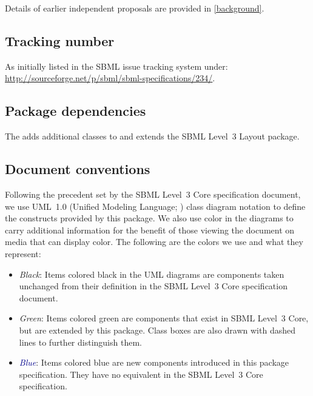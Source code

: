 Details of earlier independent proposals are provided 
in \ref{background}. 

\subsection{Tracking number} 
As initially listed in the SBML issue tracking system under:\\ 
\url{http://sourceforge.net/p/sbml/sbml-specifications/234/}. 

\subsection{Package dependencies} 

The \RenderPackage adds additional classes to \sbmlthreecore and extends the 
SBML Level~3 Layout package. 

\subsection{Document conventions} \label{conventions} 

Following the precedent set by the SBML Level~3 Core specification 
document, we use UML~1.0 (Unified Modeling Language; 
\citealt{eriksson:1998,oestereich:1999}) class diagram notation to 
define the constructs provided by this package. We also use color in the 
diagrams to carry additional information for the benefit of those 
viewing the document on media that can display color. The following are 
the colors we use and what they represent: 

\begin{itemize} 

\item[\raisebox{2.75pt}{\colorbox{black}{\rule{0.8pt}{0.8pt}}}] 
\emph{Black}: Items colored black in the UML diagrams are components 
taken unchanged from their definition in the SBML Level~3 Core 
specification document. 

\item[\raisebox{2.75pt}{\colorbox{mediumgreen}{\rule{0.8pt}{0.8pt}}}] 
\emph{\textcolor{mediumgreen}{Green}}: Items colored green are 
components that exist in SBML Level~3 Core, but are extended by this 
package. Class boxes are also drawn with dashed lines to further 
distinguish them. 

\item[\raisebox{2.75pt}{\colorbox{darkblue}{\rule{0.8pt}{0.8pt}}}] 
\emph{\textcolor{darkblue}{Blue}}: Items colored blue are new components 
introduced in this package specification. They have no equivalent in the 
SBML Level~3 Core specification. 

\end{itemize} 

